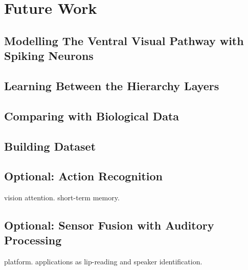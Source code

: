 \section{Future Work} 
\subsection{Modelling The Ventral Visual Pathway with Spiking Neurons}
\subsection{Learning Between the Hierarchy Layers}
\subsection{Comparing with Biological Data}
\subsection{Building Dataset}
\subsection{Optional: Action Recognition}
vision attention.
short-term memory.
\subsection{Optional: Sensor Fusion with Auditory Processing}
platform.
applications as lip-reading and speaker identification.

